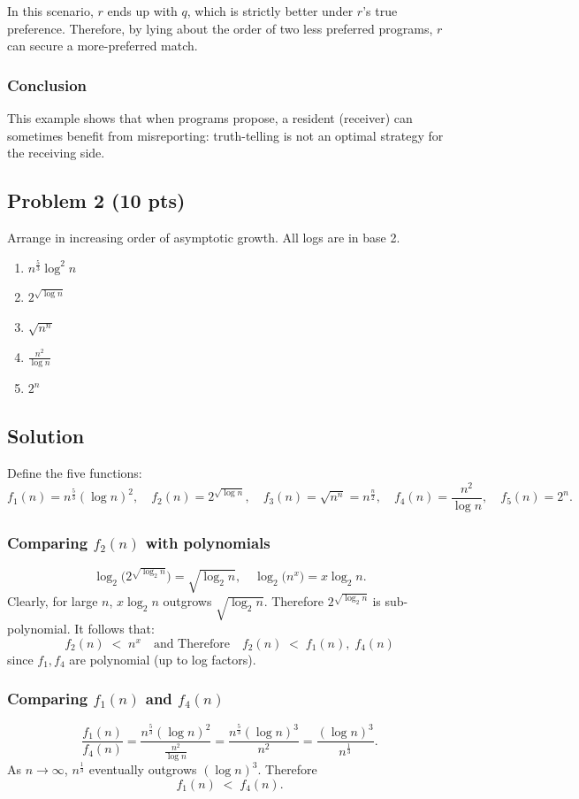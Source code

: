 \documentclass[12pt]{article}
\begin{document}
In this scenario, \(r\) ends up with \(q\), which is strictly better under \(r\)'s true preference. Therefore, by lying about the order of two less preferred programs, \(r\) can secure a more-preferred match.

\subsubsection*{Conclusion}
This example shows that when programs propose, a resident (receiver) can sometimes benefit from misreporting: truth-telling is not an optimal strategy for the receiving side. 


\subsection*{Problem 2 (10 pts)}
Arrange in increasing order of asymptotic growth. All logs are in base 2.

\begin{enumerate}
    \item \( n^{\frac{5}{3}} \log^2 n \)
    \item \( 2^{\sqrt{\log n}} \)
    \item \( \sqrt{n^n} \)
    \item \( \frac{n^2}{\log n} \)
    \item \( 2^n \)
\end{enumerate}

\subsection*{Solution}

Define the five functions:
\[
f_1(n) = n^{\tfrac{5}{3}} (\log n)^2, 
\quad
f_2(n) = 2^{\sqrt{\log n}}, 
\quad
f_3(n) = \sqrt{n^n} = n^{\tfrac{n}{2}}, 
\quad
f_4(n) = \frac{n^2}{\log n},
\quad
f_5(n) = 2^n.
\]

\subsubsection*{Comparing $f_2(n)$ with polynomials}
\[
\log_2\bigl(2^{\sqrt{\log_2 n}}\bigr) 
= \sqrt{\log_2 n}, 
\quad 
\log_2\bigl(n^x\bigr) 
= x \log_2 n.
\]
Clearly, for large \(n\), \(x \log_2 n\) outgrows \(\sqrt{\log_2 n}\). Therefore \(2^{\sqrt{\log_2 n}}\) is sub-polynomial. It follows that:
\[
f_2(n) \; < \; n^x 
\quad
\text{and Therefore}
\quad
f_2(n) \; < \; f_1(n),\; f_4(n)
\]
since \(f_1,f_4\) are polynomial (up to log factors).

\subsubsection*{Comparing $f_1(n)$ and $f_4(n)$}
\[
\frac{f_1(n)}{f_4(n)}
= \frac{n^{\tfrac{5}{3}}(\log n)^2}{\tfrac{n^2}{\log n}}
= \frac{n^{\tfrac{5}{3}}(\log n)^3}{n^2}
= \frac{(\log n)^3}{n^{\tfrac{1}{3}}}.
\]
As \(n\to\infty\), \(n^{\tfrac{1}{3}}\) eventually outgrows \((\log n)^3\). Therefore 
\[
f_1(n) \; < \; f_4(n).
\]
\end{document}
